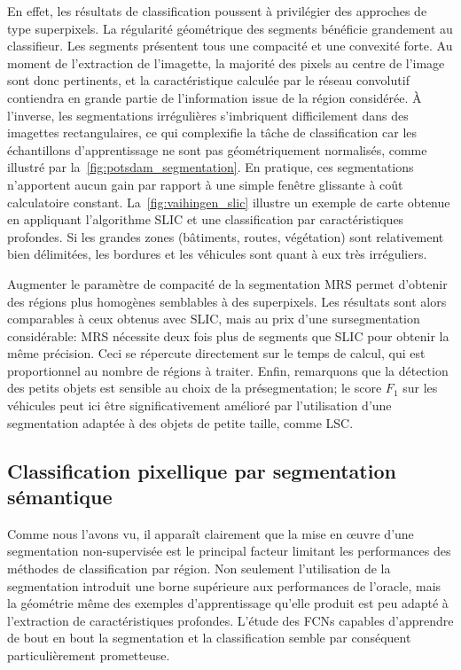 En effet, les résultats de classification poussent à privilégier des approches de type superpixels. La régularité géométrique des segments bénéficie grandement au classifieur. Les segments présentent tous une compacité et une convexité forte. Au moment de l'extraction de l'imagette, la majorité des pixels au centre de l'image sont donc pertinents, et la caractéristique calculée par le réseau convolutif contiendra en grande partie de l'information issue de la région considérée. À l'inverse, les segmentations irrégulières s'imbriquent difficilement dans des imagettes rectangulaires, ce qui complexifie la tâche de classification car les échantillons d'apprentissage ne sont pas géométriquement normalisés, comme illustré par la~\cref{fig:potsdam_segmentation}. En pratique, ces segmentations n'apportent aucun gain par rapport à une simple fenêtre glissante à coût calculatoire constant. La~\cref{fig:vaihingen_slic} illustre un exemple de carte obtenue en appliquant l'algorithme \gls{SLIC} et une classification par caractéristiques profondes. Si les grandes zones (bâtiments, routes, végétation) sont relativement bien délimitées, les bordures et les véhicules sont quant à eux très irréguliers.

Augmenter le paramètre de compacité de la segmentation \gls{MRS} permet d'obtenir des régions plus homogènes semblables à des superpixels. Les résultats sont alors comparables à ceux obtenus avec \gls{SLIC}, mais au prix d'une sursegmentation considérable: \gls{MRS} nécessite deux fois plus de segments que \gls{SLIC} pour obtenir la même précision. Ceci se répercute directement sur le temps de calcul, qui est proportionnel au nombre de régions à traiter. Enfin, remarquons que la détection des petits objets est sensible au choix de la présegmentation; le score $F_1$ sur les véhicules peut ici être significativement amélioré par l'utilisation d'une segmentation adaptée à des objets de petite taille, comme \gls{LSC}.

\subsection{Classification pixellique par segmentation sémantique}
\label{sec:results_pixel}

Comme nous l'avons vu, il apparaît clairement que la mise en \oe{}uvre d'une segmentation non-supervisée est le principal facteur limitant les performances des méthodes de classification par région. Non seulement l'utilisation de la segmentation introduit une borne supérieure aux performances de l'oracle, mais la géométrie même des exemples d'apprentissage qu'elle produit est peu adapté à l'extraction de caractéristiques profondes. L'étude des \glspl{FCN} capables d'apprendre de bout en bout la segmentation et la classification semble par conséquent particulièrement prometteuse.

